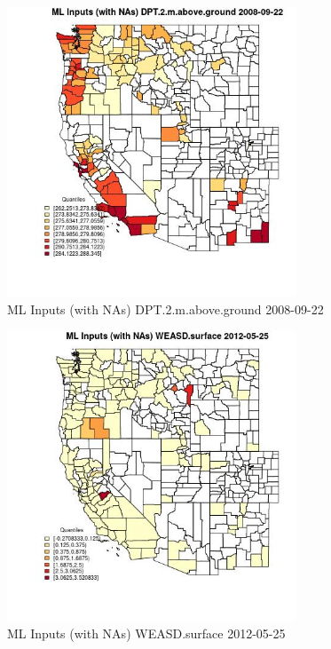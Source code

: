 \begin{figure} 
\centering  
\includegraphics[width=0.77\textwidth]{Code_Outputs/Report_ML_input_PM25_Step4_part_e_de_duplicated_aves_compiled_2019-05-18wNAs_CountyDPT2mabovegroundMean2008-09-22_2008-09-22.jpg} 
\caption{\label{fig:Report_ML_input_PM25_Step4_part_e_de_duplicated_aves_compiled_2019-05-18wNAsCountyDPT2mabovegroundMean2008-09-22_2008-09-22}ML Inputs (with NAs) DPT.2.m.above.ground 2008-09-22} 
\end{figure} 
 

\begin{figure} 
\centering  
\includegraphics[width=0.77\textwidth]{Code_Outputs/Report_ML_input_PM25_Step4_part_e_de_duplicated_aves_compiled_2019-05-18wNAs_CountyWEASDsurfaceMean2012-05-25_2012-05-25.jpg} 
\caption{\label{fig:Report_ML_input_PM25_Step4_part_e_de_duplicated_aves_compiled_2019-05-18wNAsCountyWEASDsurfaceMean2012-05-25_2012-05-25}ML Inputs (with NAs) WEASD.surface 2012-05-25} 
\end{figure} 
 

